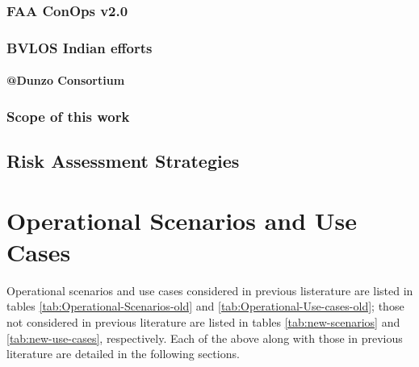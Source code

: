 \documentclass{ua_wgs_base}
\begin{document}
\subsection{FAA ConOps v2.0}

\cite{FAA-ConOps-v2}

\subsection{BVLOS Indian efforts}

\subsubsection{@Dunzo Consortium}

\subsection{Scope of this work}

\section{Risk Assessment Strategies}

\cleardoublepage{}

\chapter{Operational Scenarios and Use Cases}

Operational scenarios and use cases considered in previous listerature
are listed in tables \ref{tab:Operational-Scenarios-old} and \ref{tab:Operational-Use-cases-old};
those not considered in previous literature are listed in tables \ref{tab:new-scenarios}
and \ref{tab:new-use-cases}, respectively. Each of the above along
with those in previous literature are detailed in the following sections.
\end{document}
